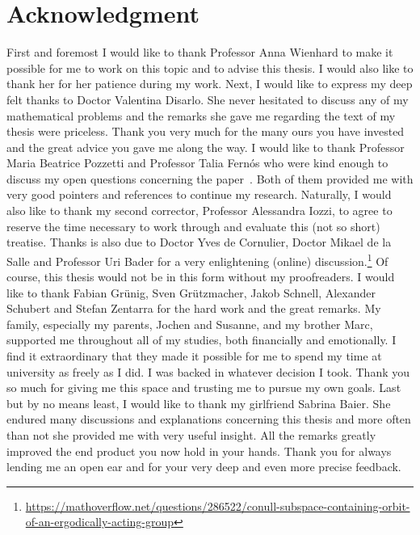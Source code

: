 \clearpage
{}
\markleft{}
\pagestyle{useheadings}
\section*{Acknowledgment}
%
\label{sec:acknowledgement}

First and foremost I would like to thank Professor Anna Wienhard to make it possible for me to work on this topic and to advise this thesis. I would also like to thank her for her patience during my work. Next, I would like to express my deep felt thanks to Doctor Valentina Disarlo. She never hesitated to discuss any of my mathematical problems and the remarks she gave me regarding the text of my thesis were priceless. Thank you very much for the many ours you have invested and the great advice you gave me along the way.
I would like to thank Professor Maria Beatrice Pozzetti and Professor Talia Fernós who were kind enough to discuss my open questions concerning the paper~\cite{MR3509968}. Both of them provided me with very good pointers and references to continue my research. Naturally, I would also like to thank my second corrector, Professor Alessandra Iozzi, to agree to reserve the time necessary to work through and evaluate this (not so short) treatise.
Thanks is also due to Doctor Yves de Cornulier, Doctor Mikael de la Salle and Professor Uri Bader for a very enlightening (online) discussion.\footnote{\url{https://mathoverflow.net/questions/286522/conull-subspace-containing-orbit-of-an-ergodically-acting-group}} 
Of course, this thesis would not be in this form without my proofreaders. I would like to thank Fabian Grünig, Sven Grützmacher, Jakob Schnell, Alexander Schubert and Stefan Zentarra for the hard work and the great remarks.
My family, especially my parents, Jochen and Susanne, and my brother Marc, supported me throughout all of my studies, both financially and emotionally. I find it extraordinary that they made it possible for me to spend my time at university as freely as I did. I was backed in whatever decision I took. Thank you so much for giving me this space and trusting me to pursue my own goals.
Last but by no means least, I would like to thank my girlfriend Sabrina Baier. She endured many discussions and explanations concerning this thesis and more often than not she provided me with very useful insight. All the remarks greatly improved the end product you now hold in your hands. Thank you for always lending me an open ear and for your very deep and even more precise feedback.

\clearpage
\pagestyle{useheadings}

